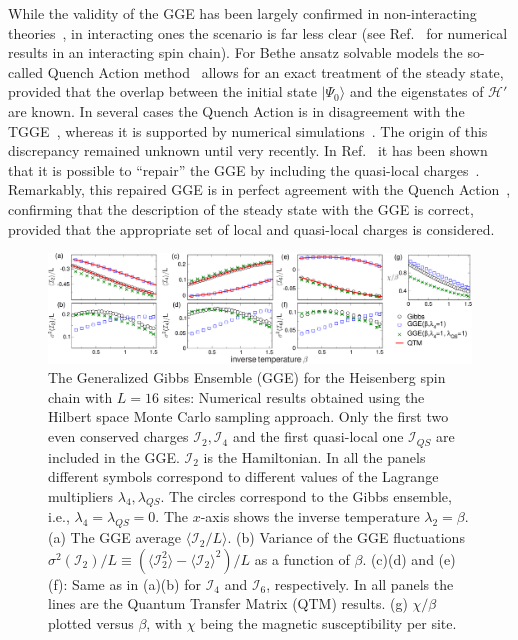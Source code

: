 \documentclass[twocolumn,superscriptaddress,prb,10pt]{revtex4-1}
\begin{document}
While the validity of the GGE has been largely confirmed in non-interacting 
theories~\cite{calabrese-2011,calabrese-2012,fagotti-2013,kcc14,kcc14a}, in interacting ones the 
scenario is far less clear (see Ref.~ for numerical results in an 
interacting spin chain). For Bethe ansatz solvable models the so-called Quench Action 
method~\cite{caux-2013} allows for an exact treatment of the steady state, 
provided that the overlap between the initial state $|\Psi_0\rangle$ and the eigenstates 
of ${\mathcal H}'$ are known. In several cases the Quench Action is in disagreement with 
the TGGE~\cite{de-nardis-2014,pozsgay-2014,wouters-2014,mestyian-2015}, whereas it is 
supported by numerical simulations~\cite{pozsgay-2014}. 
The origin of this discrepancy remained unknown until very recently. In 
Ref.~ it has been shown that it is possible to 
``repair''  the GGE by including the quasi-local charges~\cite{prosen-2014,
pereira-2014,ilievski-2015}. Remarkably, this repaired GGE is in 
perfect agreement with the Quench Action~\cite{ilievski-2015a}, confirming that 
the description of the steady state with the GGE is correct, provided that the 
appropriate set of local and quasi-local charges is considered. 

\begin{figure}[t]
\includegraphics*[width=0.93\linewidth]{./fig1}
\caption{The Generalized Gibbs Ensemble (GGE) for the Heisenberg spin chain with 
 $L=16$ sites: Numerical results obtained using the Hilbert space Monte 
 Carlo sampling approach. Only the first two even conserved charges ${\mathcal I}_2,{\mathcal I}_4$ 
 and the first quasi-local one ${\mathcal I}_{QS}$ are included in the GGE. 
 ${\mathcal I}_2$ is the Hamiltonian. In all 
 the panels different symbols correspond to different  values of the Lagrange multipliers 
 $\lambda_4,\lambda_{QS}$. The circles correspond to the Gibbs ensemble, i.e., 
 $\lambda_4=\lambda_{QS}=0$. The $x$-axis shows the inverse temperature  $\lambda_2=\beta$. 
 (a) The GGE average $\langle {\mathcal I}_2/L\rangle$. (b) Variance 
 of the GGE fluctuations $\sigma^2({\mathcal I}_2)/L\equiv(\langle {\mathcal I}_2^2
 \rangle-\langle {\mathcal I}_2\rangle^2)/L$ as a function of $\beta$. (c)(d) and (e)(f): 
 Same as in (a)(b) for ${\mathcal I}_4$ and ${\mathcal I}_6$, respectively. In all panels 
 the  lines  are the Quantum Transfer Matrix (QTM) results. 
 (g) $\chi/\beta$ plotted versus $\beta$, with 
 $\chi$ being the magnetic susceptibility per site. 
}
\label{fig1}
\end{figure}
\end{document}
